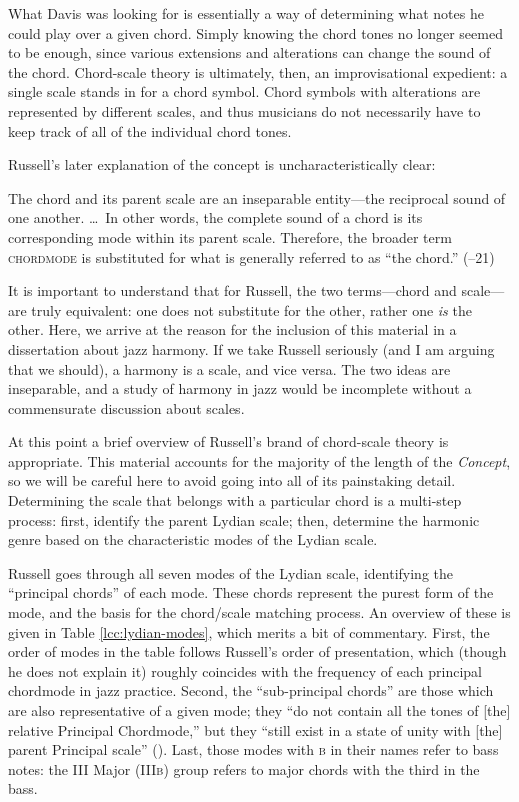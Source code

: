 What Davis was looking for is essentially a way of determining
what notes he could play over a given chord. Simply knowing the chord tones
no longer seemed to be enough, since various extensions and alterations can
change the sound of the chord. Chord-scale theory is ultimately, then, an
improvisational expedient: a single scale stands in for a chord symbol.
Chord symbols with alterations are represented by different scales, and thus
musicians do not necessarily have to keep track of all of the individual chord
tones.

Russell's later explanation of the concept is uncharacteristically clear:%
\begin{quoting}
  \singlespacing \vspace{-0.5em}
  The chord and its parent scale are an inseparable entity---the reciprocal
  sound of one another. \ldots\ In other words, the complete sound of a chord is
  its corresponding mode within its parent scale. Therefore, the broader term
  \textsc{chordmode} is substituted for what is generally referred to as ``the
  chord.'' (--21)
\end{quoting}
%
\noindent It is important to understand that for Russell, the two
terms---chord and scale---are truly equivalent: one does not substitute for
the other, rather one \emph{is} the other. Here, we arrive at the reason for
the inclusion of this material in a dissertation about jazz harmony. If we
take Russell seriously (and I am arguing that we should), a harmony is a scale,
and vice versa. The two ideas are inseparable, and a study of harmony in jazz
would be incomplete without a commensurate discussion about scales.

At this point a brief overview of Russell's brand of chord-scale theory is
appropriate. This material accounts for the majority of the length of the
\emph{Concept}, so we will be careful here to avoid going into all of its
painstaking detail. Determining the scale that belongs with a particular chord
is a multi-step process: first, identify the parent Lydian scale; then,
determine the harmonic genre based on the characteristic modes of the Lydian
scale.

Russell goes through all seven modes of the Lydian scale, identifying the
``principal chords'' of each mode. These chords represent the purest form of
the mode, and the basis for the chord/scale matching process. An overview of
these is given in Table \ref{lcc:lydian-modes}, which merits a bit of
commentary. First, the order of modes in the table follows
Russell's order of presentation, which (though he does not explain it)
roughly coincides with the frequency of each principal chordmode in jazz practice.
Second, the ``sub-principal chords'' are those which are also representative
of a given mode; they ``do not contain all the tones of [the] relative
Principal Chordmode,'' but they ``still exist in a state of unity with [the]
parent Principal scale'' (). Last, those modes with \textsc{b} in their
names refer to bass notes: the III Major (III\textsc{b}) group refers to major
chords with the third in the bass.

